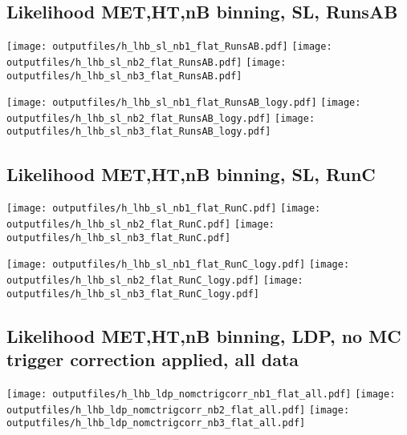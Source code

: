 \documentclass[11pt]{article}
\begin{document}
    \subsection{ Likelihood MET,HT,nB binning, SL, RunsAB}

    \noindent
     \texttt{[image: outputfiles/h\_lhb\_sl\_nb1\_flat\_RunsAB.pdf]}
     \texttt{[image: outputfiles/h\_lhb\_sl\_nb2\_flat\_RunsAB.pdf]}
     \texttt{[image: outputfiles/h\_lhb\_sl\_nb3\_flat\_RunsAB.pdf]}

    \noindent
     \texttt{[image: outputfiles/h\_lhb\_sl\_nb1\_flat\_RunsAB\_logy.pdf]}
     \texttt{[image: outputfiles/h\_lhb\_sl\_nb2\_flat\_RunsAB\_logy.pdf]}
     \texttt{[image: outputfiles/h\_lhb\_sl\_nb3\_flat\_RunsAB\_logy.pdf]}


    \subsection{ Likelihood MET,HT,nB binning, SL, RunC}

    \noindent
     \texttt{[image: outputfiles/h\_lhb\_sl\_nb1\_flat\_RunC.pdf]}
     \texttt{[image: outputfiles/h\_lhb\_sl\_nb2\_flat\_RunC.pdf]}
     \texttt{[image: outputfiles/h\_lhb\_sl\_nb3\_flat\_RunC.pdf]}

    \noindent
     \texttt{[image: outputfiles/h\_lhb\_sl\_nb1\_flat\_RunC\_logy.pdf]}
     \texttt{[image: outputfiles/h\_lhb\_sl\_nb2\_flat\_RunC\_logy.pdf]}
     \texttt{[image: outputfiles/h\_lhb\_sl\_nb3\_flat\_RunC\_logy.pdf]}







    \subsection{ Likelihood MET,HT,nB binning, LDP, no MC trigger correction applied, all data}

    \noindent
     \texttt{[image: outputfiles/h\_lhb\_ldp\_nomctrigcorr\_nb1\_flat\_all.pdf]}
     \texttt{[image: outputfiles/h\_lhb\_ldp\_nomctrigcorr\_nb2\_flat\_all.pdf]}
     \texttt{[image: outputfiles/h\_lhb\_ldp\_nomctrigcorr\_nb3\_flat\_all.pdf]}
\end{document}
